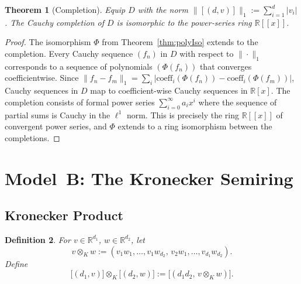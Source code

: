 \documentclass[11pt]{article}
\newtheorem{theorem}{Theorem}[section]
\newtheorem{definition}[theorem]{Definition}
\begin{document}
\begin{theorem}[Completion]\label{thm:completion}
Equip \(D\) with the norm \(\lVert[(d,v)]\rVert_1:=\sum_{i=1}^{d}|v_i|\).  The Cauchy completion of \(D\) is isomorphic to the power‑series ring \(\mathbb R[[x]]\).
\end{theorem}
\begin{proof}
The isomorphism $\Phi$ from Theorem~\ref{thm:polyIso} extends to the completion. Every Cauchy sequence $(f_n)$ in $D$ with respect to $\|\cdot\|_1$ corresponds to a sequence of polynomials $(\Phi(f_n))$ that converges coefficientwise. Since $\|f_n - f_m\|_1 = \sum_{i} |\text{coeff}_i(\Phi(f_n)) - \text{coeff}_i(\Phi(f_m))|$, Cauchy sequences in $D$ map to coefficient-wise Cauchy sequences in $\mathbb{R}[x]$. The completion consists of formal power series $\sum_{i=0}^{\infty} a_i x^i$ where the sequence of partial sums is Cauchy in the $\ell^1$ norm. This is precisely the ring $\mathbb{R}[[x]]$ of convergent power series, and $\Phi$ extends to a ring isomorphism between the completions.
\qedhere
\end{proof}

\section{Model B: The Kronecker Semiring}
\label{sec:modelB}
\subsection{Kronecker Product}
\begin{definition}
For \(v\in\mathbb R^{d_1}\), \(w\in\mathbb R^{d_2}\), let
\[v\otimes_K w := (v_1w_1,\dots,v_1w_{d_2},\,v_2w_1,\dots,v_{d_1}w_{d_2}).\]
Define
\[\bigl[(d_1,v)\bigr]\otimes_K \bigl[(d_2,w)\bigr] := \bigl[(d_1d_2,\,v\otimes_K w)\bigr].\]
\end{definition}
\end{document}
